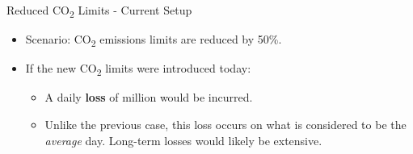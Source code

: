 \documentclass{beamer}
\begin{document}
    \begin{frame}{Reduced CO\textsubscript{2} Limits - Current Setup}
    
        \begin{itemize}
    
    		\item Scenario: CO\textsubscript{2} emissions limits are reduced by 50\%.
                
                \pause
    	
        	\item If the new CO\textsubscript{2} limits were introduced today:
    
            \begin{itemize}

                \item A daily \textbf{loss} of  million would be incurred.

                \item Unlike the previous case, this loss occurs on what is considered to be the \textit{average} day.  Long-term losses would likely be extensive.

            \end{itemize}
         
         \end{itemize}
        
    \end{frame}
      
        
        
    
    
\end{document}
